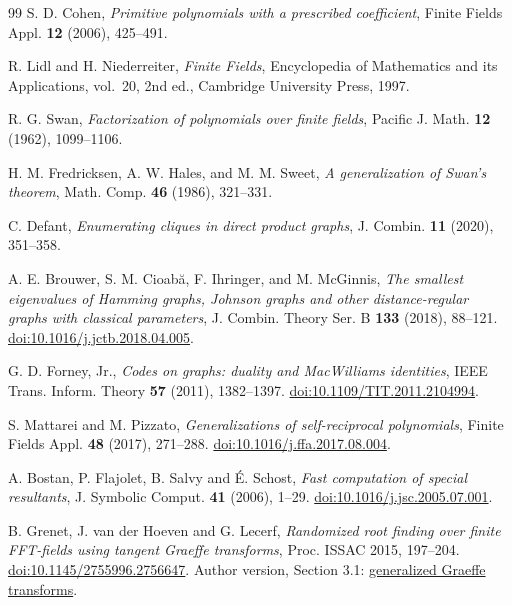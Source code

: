 \documentclass[11pt]{article}
\theoremstyle{definition}
\theoremstyle{remark}
\begin{document}
\begin{thebibliography}{99}
\small
\setlength{\itemsep}{1.5pt}
\setlength{\parsep}{0pt}
\setlength{\parskip}{0pt}
S. D. Cohen,
\emph{Primitive polynomials with a prescribed coefficient},
Finite Fields Appl. \textbf{12} (2006), 425--491.

R. Lidl and H. Niederreiter,
\emph{Finite Fields},
Encyclopedia of Mathematics and its Applications, vol.~20, 2nd ed., Cambridge University Press, 1997.

R. G. Swan,
\emph{Factorization of polynomials over finite fields},
Pacific J. Math. \textbf{12} (1962), 1099--1106.

H. M. Fredricksen, A. W. Hales, and M. M. Sweet,
\emph{A generalization of Swan's theorem},
Math. Comp. \textbf{46} (1986), 321--331.

C. Defant,
\emph{Enumerating cliques in direct product graphs},
J. Combin. \textbf{11} (2020), 351--358.

A. E. Brouwer, S. M. Cioab\u{a}, F. Ihringer, and M. McGinnis,
\emph{The smallest eigenvalues of Hamming graphs, Johnson graphs and
other distance-regular graphs with classical parameters},
J. Combin. Theory Ser. B \textbf{133} (2018), 88--121.
\href{https://doi.org/10.1016/j.jctb.2018.04.005}{doi:10.1016/j.jctb.2018.04.005}.

G. D. Forney, Jr.,
\emph{Codes on graphs: duality and MacWilliams identities},
IEEE Trans. Inform. Theory \textbf{57} (2011), 1382--1397.
\href{https://doi.org/10.1109/TIT.2011.2104994}{doi:10.1109/TIT.2011.2104994}.

S. Mattarei and M. Pizzato,
\emph{Generalizations of self-reciprocal polynomials},
Finite Fields Appl. \textbf{48} (2017), 271--288.
\href{https://doi.org/10.1016/j.ffa.2017.08.004}{doi:10.1016/j.ffa.2017.08.004}.

A. Bostan, P. Flajolet, B. Salvy and \'E. Schost,
\emph{Fast computation of special resultants},
J. Symbolic Comput. \textbf{41} (2006), 1--29.
\href{https://doi.org/10.1016/j.jsc.2005.07.001}{doi:10.1016/j.jsc.2005.07.001}.

B. Grenet, J. van der Hoeven and G. Lecerf,
\emph{Randomized root finding over finite FFT-fields using tangent Graeffe transforms},
Proc. ISSAC 2015, 197--204.
\href{https://doi.org/10.1145/2755996.2756647}{doi:10.1145/2755996.2756647}.
Author version, Section 3.1:
\href{https://www.texmacs.org/joris/rmodroots/rmodroots.html}{generalized Graeffe transforms}.


\end{thebibliography}
\end{document}
